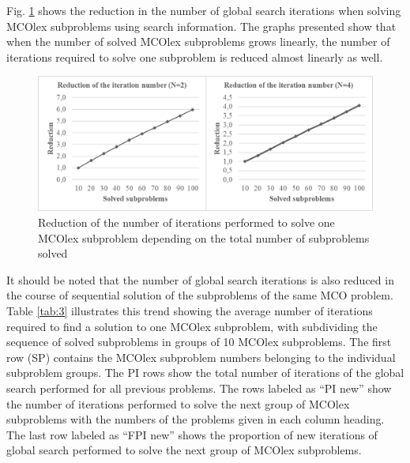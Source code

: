 \documentclass[smallextended]{svjour3}       %
\begin{document}
Fig. \ref{fig:5} shows the reduction in the number of global search iterations when solving MCOlex subproblems using search information. The graphs presented show that when the number of solved MCOlex subproblems grows linearly, the number of iterations required to solve one subproblem is reduced almost linearly as well.

\begin{figure}
  \centering
  \includegraphics[width=1\linewidth]{fig5}
  \caption{Reduction of the number of iterations performed to solve one MCOlex subproblem depending on the total number of subproblems solved}
  \label{fig:5}
\end{figure}

It should be noted that the number of global search iterations is also reduced in the course of sequential solution of the subproblems of the same MCO problem. Table \ref{tab:3} illustrates this trend showing the average number of iterations required to find a solution to one MCOlex subproblem, with subdividing the sequence of solved subproblems in groups of 10 MCOlex subproblems. The first row (SP) contains the MCOlex subproblem numbers belonging to the individual subproblem groups. The PI rows show the total number of iterations of the global search performed for all previous problems. The rows labeled as ``PI new'' show the number of iterations performed to solve the next group of MCOlex subproblems with the numbers of the problems given in each column heading. The last row labeled as ``FPI new'' shows the proportion of new iterations of global search performed to solve the next group of MCOlex subproblems.
\end{document}
